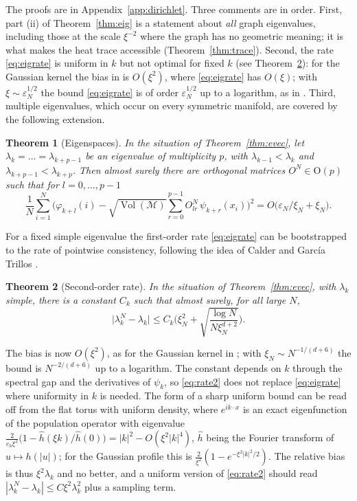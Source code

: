 \documentclass[11pt,a4paper]{article}
\theoremstyle{stmt}
\newtheorem{theorem}{Theorem}[section]
\theoremstyle{defn}
\theoremstyle{rmk}
\numberwithin{equation}{section}
\DeclareMathOperator{\Vol}{Vol}
\newcommand{\M}{\mathcal{M}}
\begin{document}
The proofs are in Appendix~\ref{app:dirichlet}. Three comments are in order. First, part (ii) of Theorem~\ref{thm:eig} is a statement about \emph{all} graph eigenvalues, including those at the scale $\xi^{-2}$ where the graph has no geometric meaning; it is what makes the heat trace accessible (Theorem~\ref{thm:trace}). Second, the rate \eqref{eq:eigrate} is uniform in $k$ but not optimal for fixed $k$ (see Theorem~\ref{thm:rate2}): for the Gaussian kernel the bias in \cite{ChengWu} is $O(\xi^2)$, where \eqref{eq:eigrate} has $O(\xi)$; with $\xi\sim\varepsilon_N^{1/2}$ the bound \eqref{eq:eigrate} is of order $\varepsilon_N^{1/2}$ up to a logarithm, as in \cite{GTGHS}. Third, multiple eigenvalues, which occur on every symmetric manifold, are covered by the following extension.

\begin{theorem}[Eigenspaces]\label{thm:cluster}
In the situation of Theorem~\ref{thm:evec}, let $\lambda_k=\dots=\lambda_{k+p-1}$ be an eigenvalue of multiplicity $p$, with $\lambda_{k-1}<\lambda_k$ and $\lambda_{k+p-1}<\lambda_{k+p}$. Then almost surely there are orthogonal matrices $O^N\in\mathrm O(p)$ such that for $l=0,\dots,p-1$
\begin{equation}
\frac1N\sum_{i=1}^N\Big(\varphi_{k+l}(i)-\sqrt{\Vol(\M)}\sum_{r=0}^{p-1}O^N_{lr}\,\psi_{k+r}(x_i)\Big)^2=O\big(\varepsilon_N/\xi_N+\xi_N\big).
\end{equation}
\end{theorem}

For a fixed simple eigenvalue the first-order rate \eqref{eq:eigrate} can be bootstrapped to the rate of pointwise consistency, following the idea of Calder and Garc\'ia Trillos \cite{CalderGT}.

\begin{theorem}[Second-order rate]\label{thm:rate2}
In the situation of Theorem~\ref{thm:evec}, with $\lambda_k$ simple, there is a constant $C_k$ such that almost surely, for all large $N$,
\begin{equation}\label{eq:rate2}
\big|\lambda_k^N-\lambda_k\big|\le C_k\Big(\xi_N^2+\sqrt{\frac{\log N}{N\xi_N^{d+2}}}\Big).
\end{equation}
\end{theorem}

The bias is now $O(\xi^2)$, as for the Gaussian kernel in \cite{ChengWu}; with $\xi_N\sim N^{-1/(d+6)}$ the bound is $N^{-2/(d+6)}$ up to a logarithm. The constant depends on $k$ through the spectral gap and the derivatives of $\psi_k$, so \eqref{eq:rate2} does not replace \eqref{eq:eigrate} where uniformity in $k$ is needed. The form of a sharp uniform bound can be read off from the flat torus with uniform density, where $e^{ik\cdot x}$ is an exact eigenfunction of the population operator with eigenvalue $\tfrac{2}{c_h\xi^2}\big(1-\hat h(\xi k)/\hat h(0)\big)=|k|^2-O(\xi^2|k|^4)$, $\hat h$ being the Fourier transform of $u\mapsto h(|u|)$; for the Gaussian profile this is $\tfrac2{\xi^2}(1-e^{-\xi^2|k|^2/2})$. The relative bias is thus $\xi^2\lambda_k$ and no better, and a uniform version of \eqref{eq:rate2} should read $|\lambda_k^N-\lambda_k|\le C\xi^2\lambda_k^2$ plus a sampling term.
\end{document}
